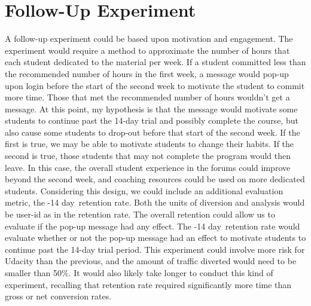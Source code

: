 \documentclass[paper=a4, fontsize=11pt]{scrartcl} %
\numberwithin{equation}{section} %
\numberwithin{figure}{section} %
\numberwithin{table}{section} %
\begin{document}

\section{Follow-Up Experiment}

A follow-up experiment could be based upon motivation and engagement.  The experiment would require a method to approximate the number of hours that each student dedicated to the material per week.  If a student committed less than the recommended number of hours in the first week, a message would pop-up upon login before the start of the second week to motivate the student to commit more time.
Those that met the recommended number of hours wouldn't get a message.  At this point, my hypothesis is that the message would motivate some students to continue past the 14-day trial and possibly complete the course, but also cause some students to drop-out before that start of the second week.  If the first is true, we may be able to motivate students to change their habits.  If the second is true, those students that may not complete the program would then leave.  In this case, the overall student experience in the forums could improve beyond the second week, and coaching resources could be used on more dedicated students. \newline
\newline
Considering this design, we could include an additional evaluation metric, the -14 day\textquotesingle \ retention rate.  Both the units of diversion and analysis would be user-id as in the retention rate.  The overall retention could allow us to evaluate if the pop-up message had any effect.  The -14 day\textquotesingle \ retention rate would evaluate whether or not the pop-up message had an effect to motivate students to continue past the 14-day trial period.  This experiment could involve more risk for Udacity than the previous, and the amount of traffic diverted would need to be smaller than 50\%.  It would also likely take longer to conduct this kind of experiment, recalling that retention rate required significantly more time than gross or net conversion rates.
\end{document}
